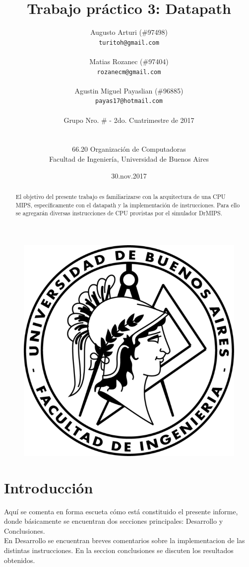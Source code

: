 \documentclass[a4paper,10pt]{article}
\title{\textbf{Trabajo práctico 3: Datapath}}
\author{Augusto Arturi (\#97498)\\
\texttt{turitoh@gmail.com}\\
\\
Matias Rozanec (\#97404)\\            \texttt{rozanecm@gmail.com}\\
\\
Agustin Miguel Payaslian (\#96885)\\            \texttt{payas17@hotmail.com}\\
\\
\normalsize{Grupo Nro. \# - 2do. Cuatrimestre de 2017}\\
\\
\\
\normalsize{66.20 Organización de Computadoras}\\
\normalsize{Facultad de Ingeniería, Universidad de Buenos Aires}\\
}
\date{30.nov.2017}
\begin{document}
\maketitle


\begin{figure}[!htp]
\centering
\includegraphics[scale=1]{fiuba_logo.png} 

\end{figure}
\thispagestyle{empty}
\newpage

\begin{abstract}
El objetivo del presente trabajo es familiarizarse con la arquitectura de una CPU MIPS, específicamente con el datapath y la implementación de instrucciones. Para ello se agregarán diversas instrucciones de CPU provistas por el simulador DrMIPS.
\end{abstract}


\section{Introducción}
Aquí se comenta en forma escueta cómo está constituido el presente informe, donde  básicamente  se  encuentran  dos  secciones  principales: Desarrollo y Conclusiones.\\
En Desarrollo se encuentran breves comentarios sobre la implementacion de las distintas instrucciones. En la seccion conclusiones se discuten los resultados obtenidos.
\end{document}
